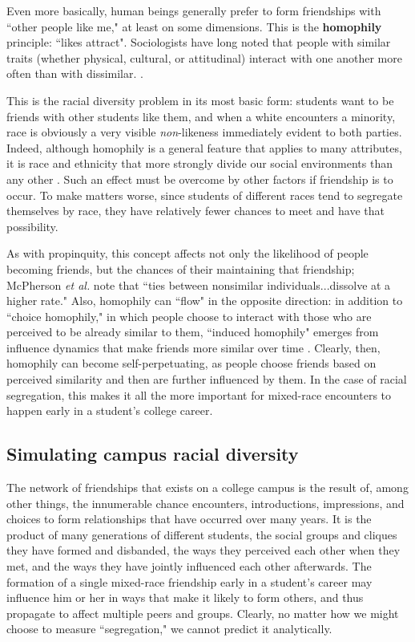 Even more basically, human beings generally prefer to form friendships with
``other people like me," at least on some dimensions. This is the
\textbf{homophily} principle: ``likes attract". Sociologists have long noted
that people with similar traits (whether physical, cultural, or attitudinal)
interact with one another more often than with dissimilar. 
\cite{centola_homophily_2007}.

This is the racial diversity problem in its most basic form: students want to
be friends with other students like them, and when a white encounters a
minority, race is obviously a very visible \textit{non}-likeness immediately
evident to both parties. Indeed, although homophily is a general feature that
applies to many attributes, it is race and ethnicity that more strongly divide
our social environments than any other \cite{mcpherson_birds_2001}. Such an
effect must be overcome by other factors if friendship is to occur. To make
matters worse, since students of different races tend to segregate themselves
by race, they have relatively fewer chances to meet and have that possibility.

As with propinquity, this concept affects not only the likelihood of people
becoming friends, but the chances of their maintaining that friendship;
McPherson \textit{et al.} note that ``ties between nonsimilar
individuals...dissolve at a higher rate." \cite[p.415]{mcpherson_birds_2001}
Also, homophily can ``flow" in the opposite direction: in addition to ``choice
homophily," in which people choose to interact with those who are perceived to
be already similar to them, ``induced homophily" emerges from influence
dynamics that make friends more similar over time
\cite{mcpherson_homophily_1987}. Clearly, then, homophily can become
self-perpetuating, as people choose friends based on perceived similarity and
then are further influenced by them. In the case of racial segregation, this
makes it all the more important for mixed-race encounters to happen early in a
student's college career.

\subsection{Simulating campus racial diversity}

The network of friendships that exists on a college campus is the result of,
among other things, the innumerable chance encounters, introductions,
impressions, and choices to form relationships that have occurred over many
years. It is the product of many generations of different students, the social
groups and cliques they have formed and disbanded, the ways they perceived
each other when they met, and the ways they have jointly influenced each other
afterwards. The formation of a single mixed-race friendship early in a
student's career may influence him or her in ways that make it likely to form
others, and thus propagate to affect multiple peers and groups. Clearly, no
matter how we might choose to measure ``segregation," we cannot predict it
analytically.  

